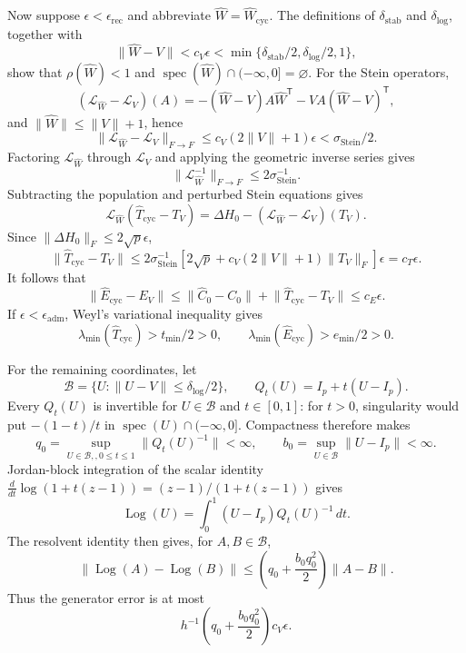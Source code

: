 Now suppose \(\epsilon<\epsilon_{\mathrm{rec}}\) and abbreviate \(\widehat W=\widehat W_{\mathrm{cyc}}\).  The definitions of \(\delta_{\mathrm{stab}}\) and \(\delta_{\log}\), together with
\[
 \lVert\widehat W-V\rVert<c_V\epsilon
 <\min\{\delta_{\mathrm{stab}}/2,\delta_{\log}/2,1\},
\]
show that \(\rho(\widehat W)<1\) and \(\operatorname{spec}(\widehat W)\cap(-\infty,0]=\varnothing\).  For the Stein operators,
\[
 (\mathcal L_{\widehat W}-\mathcal L_V)(A)
 =-(\widehat W-V)A\widehat W^{\mathsf T}-VA(\widehat W-V)^{\mathsf T},
\]
and \(\lVert\widehat W\rVert\leq\lVert V\rVert+1\), hence
\[
 \lVert\mathcal L_{\widehat W}-\mathcal L_V\rVert_{F\to F}
 \leq c_V(2\lVert V\rVert+1)\epsilon<\sigma_{\mathrm{Stein}}/2.
\]
Factoring \(\mathcal L_{\widehat W}\) through \(\mathcal L_V\) and applying the geometric inverse series gives
\[
 \lVert\mathcal L_{\widehat W}^{-1}\rVert_{F\to F}
 \leq2\sigma_{\mathrm{Stein}}^{-1}.
\]
Subtracting the population and perturbed Stein equations gives
\[
 \mathcal L_{\widehat W}(\widehat T_{\mathrm{cyc}}-T_V)
 =\Delta H_0-(\mathcal L_{\widehat W}-\mathcal L_V)(T_V).
\]
Since \(\lVert\Delta H_0\rVert_F\leq2\sqrt p\epsilon\),
\[
 \lVert\widehat T_{\mathrm{cyc}}-T_V\rVert
 \leq2\sigma_{\mathrm{Stein}}^{-1}
 [2\sqrt p+c_V(2\lVert V\rVert+1)\lVert T_V\rVert_F]\epsilon
 =c_T\epsilon.
\]
It follows that
\[
 \lVert\widehat E_{\mathrm{cyc}}-E_V\rVert
 \leq\lVert\widehat C_0-C_0\rVert+
 \lVert\widehat T_{\mathrm{cyc}}-T_V\rVert
 \leq c_E\epsilon.
\]
If \(\epsilon<\epsilon_{\mathrm{adm}}\), Weyl's variational inequality gives
\[
 \lambda_{\min}(\widehat T_{\mathrm{cyc}})>t_{\min}/2>0,
 \qquad \lambda_{\min}(\widehat E_{\mathrm{cyc}})>e_{\min}/2>0.
\]

For the remaining coordinates, let
\[
 \mathcal B=\{U:\lVert U-V\rVert\leq\delta_{\log}/2\},\qquad
 Q_t(U)=I_p+t(U-I_p).
\]
Every \(Q_t(U)\) is invertible for \(U\in\mathcal B\) and \(t\in[0,1]\): for \(t>0\), singularity would put \(-(1-t)/t\) in \(\operatorname{spec}(U)\cap(-\infty,0]\).  Compactness therefore makes
\[
 q_0=\sup_{U\in\mathcal B,,0\leq t\leq1}\lVert Q_t(U)^{-1}\rVert<\infty,
 \qquad b_0=\sup_{U\in\mathcal B}\lVert U-I_p\rVert<\infty.
\]
Jordan-block integration of the scalar identity
\(
 \frac{d}{dt}\log(1+t(z-1))=(z-1)/(1+t(z-1))
\)
gives
\[
 \operatorname{Log}(U)=\int_0^1(U-I_p)Q_t(U)^{-1}\,dt.
\]
The resolvent identity then gives, for \(A,B\in\mathcal B\),
\[
 \lVert\operatorname{Log}(A)-\operatorname{Log}(B)\rVert
 \leq\left(q_0+\frac{b_0q_0^2}{2}\right)\lVert A-B\rVert.
\]
Thus the generator error is at most
\[
 h^{-1}\left(q_0+\frac{b_0q_0^2}{2}\right)c_V\epsilon.
\]

